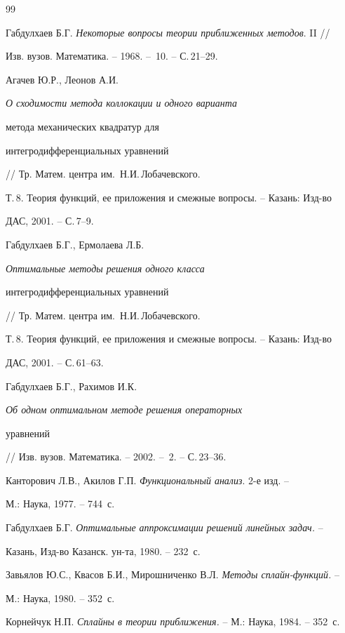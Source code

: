 \begin{thebibliography}{99}







Габдулхаев Б.Г. {\it Некоторые вопросы теории приближенных методов}. II //


Изв. вузов. Математика. -- 1968. -- \No\,10. -- С.\,21--29.




Агачев Ю.Р., Леонов А.И. {\it О сходимости метода коллокации и одного варианта


метода механических квадратур для


интегродифференциальных уравнений} // Тр. Матем. центра им.~Н.И.\,Лобачевского.


Т.\,8. Теория функций, ее приложения и смежные вопросы. -- Казань: Изд-во


ДАС, 2001. -- С.\,7--9.




Габдулхаев Б.Г., Ермолаева Л.Б. {\it Оптимальные методы решения одного класса


интегродифференциальных уравнений} // Тр. Матем. центра им.~Н.И.\,Лобачевского.


Т.\,8. Теория функций, ее приложения и смежные вопросы. -- Казань: Изд-во


ДАС, 2001. -- С.\,61--63.




Габдулхаев Б.Г., Рахимов И.К. {\it Об одном оптимальном методе решения операторных


уравнений} // Изв. вузов. Математика. -- 2002. -- \No\,2. -- С.\,23--36.




Канторович Л.В., Акилов Г.П. {\it Функциональный анализ}. 2-е изд. --


М.: Наука, 1977. -- 744~с.




Габдулхаев Б.Г. {\it Оптимальные аппроксимации решений линейных задач.} --


Казань, Изд-во Казанск. ун-та, 1980. -- 232~с.




Завьялов Ю.С., Квасов Б.И., Мирошниченко В.Л. {\it Методы сплайн-функций.} --


М.: Наука, 1980. -- 352~с.




Корнейчук Н.П. {\it Сплайны в теории приближения.} -- М.: Наука, 1984. -- 352~с.



\end{thebibliography}
